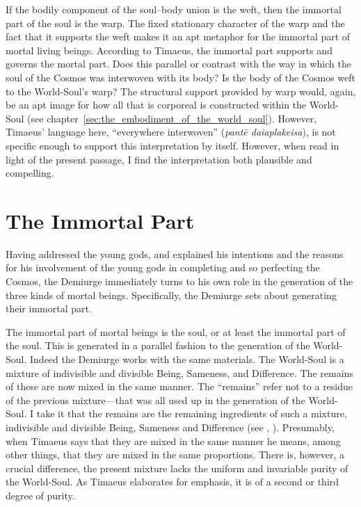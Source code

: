 If the bodily component of the soul--body union is the weft, then the immortal part of the soul is the warp. The fixed stationary character of the warp and the fact that it supports the weft makes it an apt metaphor for the immortal part of mortal living beings. According to Timaeus, the immortal part supports and governs the mortal part. Does this parallel or contrast with the way in which the soul of the Cosmos was interwoven with its body? Is the body of the Cosmos weft to the World-Soul's warp? The structural support provided by warp would, again, be an apt image for how all that is corporeal is constructed within the World-Soul (see chapter~\ref{sec:the_embodiment_of_the_world_soul}). However, Timaeus' language here, ``everywhere interwoven'' (\emph{pantē daiaplakeisa}), is not specific enough to support this interpretation by itself. However, when read in light of the present passage, I find the interpretation both plausible and compelling.


\section{The Immortal Part} %
\label{sec:the_immortal_part}

Having addressed the young gods, and explained his intentions and the reasons for his involvement of the young gods in completing and so perfecting the Cosmos, the Demiurge immediately turns to his own role in the generation of the three kinds of mortal beings. Specifically, the Demiurge sets about generating their immortal part. 

The immortal part of mortal beings is the soul, or at least the immortal part of the soul. This is generated in a parallel fashion to the generation of the World-Soul. Indeed the Demiurge works with the same materials. The World-Soul is a mixture of indivisible and divisible Being, Sameness, and Difference. The remains of these are now mixed in the same manner. The ``remains'' refer not to a residue of the previous mixture---that was all used up in the generation of the World-Soul. I take it that the remains are the remaining ingredients of such a mixture, indivisible and divisible Being, Sameness and Difference (see \citealt[141 n10]{Archer-Hind:1888qd}, \citealt[255]{Taylor:1928qb}). Presumably, when Timaeus says that they are mixed in the same manner he means, among other things, that they are mixed in the same proportions. There is, however, a crucial difference, the present mixture lacks the uniform and invariable purity of the World-Soul. As Timaeus elaborates for emphasis, it is of a second or third degree of purity. 

